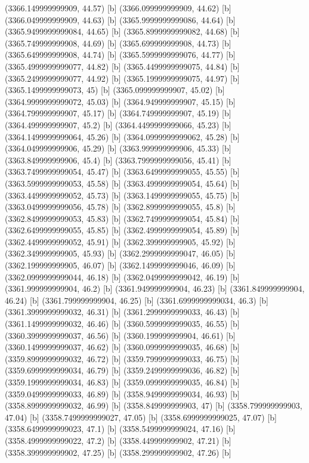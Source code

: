 {{{(3366.149999999909, 44.57) [b] 
(3366.099999999909, 44.62) [b] 
(3366.049999999909, 44.63) [b] 
(3365.9999999999086, 44.64) [b] 
(3365.9499999999084, 44.65) [b] 
(3365.8999999999082, 44.68) [b] 
(3365.749999999908, 44.69) [b] 
(3365.699999999908, 44.73) [b] 
(3365.649999999908, 44.74) [b] 
(3365.5999999999076, 44.77) [b] 
(3365.4999999999077, 44.82) [b] 
(3365.4499999999075, 44.84) [b] 
(3365.2499999999077, 44.92) [b] 
(3365.1999999999075, 44.97) [b] 
(3365.1499999999073, 45) [b] 
(3365.099999999907, 45.02) [b] 
(3364.9999999999072, 45.03) [b] 
(3364.949999999907, 45.15) [b] 
(3364.799999999907, 45.17) [b] 
(3364.749999999907, 45.19) [b] 
(3364.499999999907, 45.2) [b] 
(3364.4499999999066, 45.23) [b] 
(3364.1499999999064, 45.26) [b] 
(3364.0999999999062, 45.28) [b] 
(3364.049999999906, 45.29) [b] 
(3363.999999999906, 45.33) [b] 
(3363.849999999906, 45.4) [b] 
(3363.7999999999056, 45.41) [b] 
(3363.7499999999054, 45.47) [b] 
(3363.6499999999055, 45.55) [b] 
(3363.5999999999053, 45.58) [b] 
(3363.4999999999054, 45.64) [b] 
(3363.4499999999052, 45.73) [b] 
(3363.1499999999055, 45.75) [b] 
(3363.0499999999056, 45.78) [b] 
(3362.8999999999055, 45.8) [b] 
(3362.8499999999053, 45.83) [b] 
(3362.7499999999054, 45.84) [b] 
(3362.6499999999055, 45.85) [b] 
(3362.4999999999054, 45.89) [b] 
(3362.4499999999052, 45.91) [b] 
(3362.399999999905, 45.92) [b] 
(3362.349999999905, 45.93) [b] 
(3362.2999999999047, 46.05) [b] 
(3362.199999999905, 46.07) [b] 
(3362.1499999999046, 46.09) [b] 
(3362.0999999999044, 46.18) [b] 
(3362.0499999999042, 46.19) [b] 
(3361.999999999904, 46.2) [b] 
(3361.949999999904, 46.23) [b] 
(3361.849999999904, 46.24) [b] 
(3361.799999999904, 46.25) [b] 
(3361.6999999999034, 46.3) [b] 
(3361.3999999999032, 46.31) [b] 
(3361.2999999999033, 46.43) [b] 
(3361.1499999999032, 46.46) [b] 
(3360.5999999999035, 46.55) [b] 
(3360.3999999999037, 46.56) [b] 
(3360.199999999904, 46.61) [b] 
(3360.1499999999037, 46.62) [b] 
(3360.0999999999035, 46.68) [b] 
(3359.8999999999032, 46.72) [b] 
(3359.7999999999033, 46.75) [b] 
(3359.6999999999034, 46.79) [b] 
(3359.2499999999036, 46.82) [b] 
(3359.1999999999034, 46.83) [b] 
(3359.0999999999035, 46.84) [b] 
(3359.0499999999033, 46.89) [b] 
(3358.9499999999034, 46.93) [b] 
(3358.8999999999032, 46.99) [b] 
(3358.849999999903, 47) [b] 
(3358.799999999903, 47.04) [b] 
(3358.7499999999027, 47.05) [b] 
(3358.6999999999025, 47.07) [b] 
(3358.6499999999023, 47.1) [b] 
(3358.5499999999024, 47.16) [b] 
(3358.4999999999022, 47.2) [b] 
(3358.449999999902, 47.21) [b] 
(3358.399999999902, 47.25) [b] 
(3358.299999999902, 47.26) [b] 
}}}
